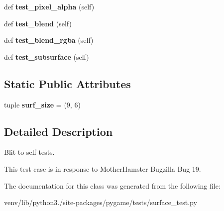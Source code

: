 \begin{DoxyCompactItemize}
def {\bfseries test\+\_\+pixel\+\_\+alpha} (self)
\item 
\mbox{\label{classpygame_1_1tests_1_1surface__test_1_1_surface_self_blit_test_a834ee807eaf6c67b35f7d56748776ffe}} 
def {\bfseries test\+\_\+blend} (self)
\item 
\mbox{\label{classpygame_1_1tests_1_1surface__test_1_1_surface_self_blit_test_afdb9ff1557a5e71af23b8b638ccca859}} 
def {\bfseries test\+\_\+blend\+\_\+rgba} (self)
\item 
\mbox{\label{classpygame_1_1tests_1_1surface__test_1_1_surface_self_blit_test_a574d6cbca7f4999f7e7d6fb6404b482c}} 
def {\bfseries test\+\_\+subsurface} (self)
\end{DoxyCompactItemize}
\subsection*{Static Public Attributes}
\begin{DoxyCompactItemize}
\item 
\mbox{\label{classpygame_1_1tests_1_1surface__test_1_1_surface_self_blit_test_a54af298a2f75195bca0ddf04340fc6c3}} 
tuple {\bfseries surf\+\_\+size} = (9, 6)
\end{DoxyCompactItemize}


\subsection{Detailed Description}
\begin{DoxyVerb}Blit to self tests.

This test case is in response to MotherHamster Bugzilla Bug 19.
\end{DoxyVerb}
 

The documentation for this class was generated from the following file\+:\begin{DoxyCompactItemize}
\item 
venv/lib/python3./site-\/packages/pygame/tests/surface\+\_\+test.\+py\end{DoxyCompactItemize}
